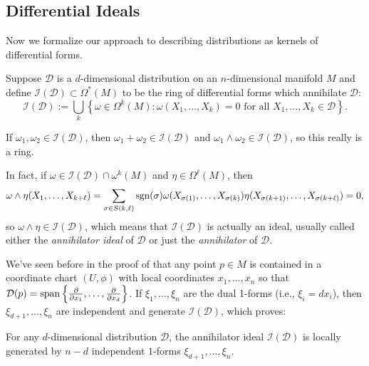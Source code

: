 \subsection{Differential Ideals} 
\label{sub:differential_ideals}

Now we formalize our approach to describing distributions as kernels of differential forms.

\begin{definition}\label{def:annihilator ideal}
	Suppose $\mathcal{D}$ is a $d$-dimensional distribution on an $n$-dimensional manifold $M$ and define $\mathcal{I}(\mathcal{D}) \subset \Omega^\ast (M)$ to be the ring of differential forms which annihilate $\mathcal{D}$:
	\[
		\mathcal{I}(\mathcal{D}) := \bigcup_k \left\{ \omega \in \Omega^k(M) : \omega(X_1, \dots , X_k) = 0 \text{ for all } X_1, \dots , X_k \in \mathcal{D} \right\}.
	\]
\end{definition}

If $\omega_1, \omega_2 \in \mathcal{I}(\mathcal{D})$, then $\omega_1 + \omega_2 \in \mathcal{I}(\mathcal{D})$ and $\omega_1 \wedge \omega_2 \in \mathcal{I}(\mathcal{D})$, so this really is a ring.

In fact, if $\omega \in \mathcal{I}(\mathcal{D}) \cap \omega^k(M)$ and $\eta \in \Omega^\ell(M)$, then
\[
	\omega \wedge \eta (X_1, \dots , X_{k+\ell}) = \sum_{\sigma \in S(k,\ell)} \operatorname{sgn}(\sigma) \omega(X_{\sigma(1)}, \dots , X_{\sigma(k)}) \eta(X_{\sigma(k+1)}, \dots , X_{\sigma(k+\ell)}) = 0,
\]
so $\omega \wedge \eta \in \mathcal{I}(\mathcal{D})$, which means that $\mathcal{I}(\mathcal{D})$ is actually an ideal, usually called either the \emph{annihilator ideal} of $\mathcal{D}$ or just the \emph{annihilator} of $\mathcal{D}$.

We've seen before in the proof of  that any point $p \in M$ is contained in a coordinate chart $(U,\phi)$ with local coordinates $x_1, \dots , x_n$ so that $\mathcal{D}(p) = \operatorname{span} \left\{\frac{\partial}{\partial x_1}, \dots , \frac{\partial}{\partial x_d} \right\}$. If $\xi_1, \dots , \xi_n$ are the dual 1-forms (i.e., $\xi_i = dx_i$), then $\xi_{d+1}, \dots , \xi_n$ are independent and generate $\mathcal{I}(\mathcal{D})$, which proves:

\begin{lemma}\label{lem:annihilator generators}
	For any $d$-dimensional distribution $\mathcal{D}$, the annihilator ideal $\mathcal{I}(\mathcal{D})$ is locally generated by $n-d$ independent $1$-forms $\xi_{d+1},\dots , \xi_n$.
\end{lemma}

